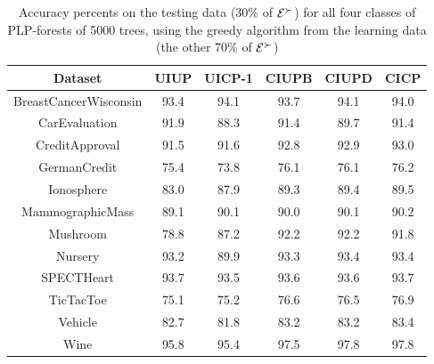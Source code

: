 \begin{table}
  \centering
  \small
  \begin{tabular}{ |c||c|c|c|c|c| }
    \hline
    Dataset          				 & UIUP & UICP-1 & CIUPB & CIUPD & CICP \\
    \hline \hline                                              
    BreastCancerWisconsin                      & 93.4 & 94.1   & 93.7  & 94.1  & 94.0 \\ \hline
    CarEvaluation                       & 91.9 & 88.3   & 91.4  & 89.7  & 91.4 \\ \hline
    CreditApproval                       & 91.5 & 91.6   & 92.8  & 92.9  & 93.0 \\ \hline 
    GermanCredit                       & 75.4 & 73.8   & 76.1  & 76.1  & 76.2 \\ \hline     
    Ionosphere                       & 83.0 & 87.9   & 89.3  & 89.4  & 89.5 \\ \hline   
    MammographicMass                       & 89.1 & 90.1   & 90.0  & 90.1  & 90.2 \\ \hline         
    Mushroom                       & 78.8 & 87.2   & 92.2  & 92.2  & 91.8 \\ \hline 
    Nursery                       & 93.2 & 89.9   & 93.3  & 93.4  & 93.4 \\ \hline
    SPECTHeart                       & 93.7 & 93.5   & 93.6  & 93.6  & 93.7 \\ \hline   
    TicTacToe                      & 75.1 & 75.2   & 76.6  & 76.5  & 76.9 \\ \hline 
    Vehicle                       & 82.7 & 81.8   & 83.2  & 83.2  & 83.4 \\ \hline
    Wine                       & 95.8 & 95.4   & 97.5  & 97.8  & 97.8 \\ \hline
  \end{tabular}
  \caption{Accuracy percents on the testing data (30\% of $\mathcal{E}^\succ$)
					 for all four classes of PLP-forests of 5000 trees, 
					 using the greedy algorithm from the learning 
					 data (the other 70\% of $\mathcal{E}^\succ$)}
  \label{tbl:forests2}
\end{table}


